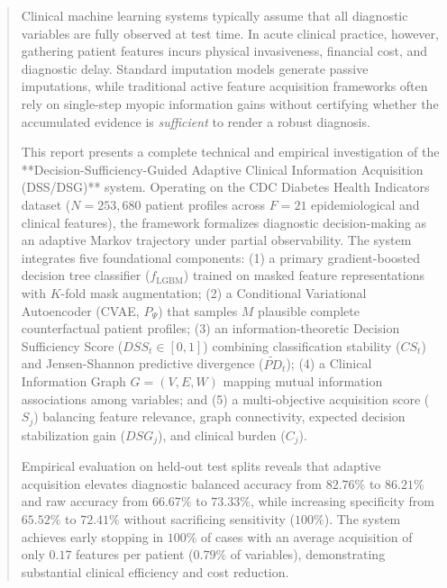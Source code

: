 \documentclass[11pt,a4paper]{report}
\begin{document}
\setcounter{page}{1}

\begin{abstract}
Clinical machine learning systems typically assume that all diagnostic variables are fully observed at test time. In acute clinical practice, however, gathering patient features incurs physical invasiveness, financial cost, and diagnostic delay. Standard imputation models generate passive imputations, while traditional active feature acquisition frameworks often rely on single-step myopic information gains without certifying whether the accumulated evidence is \textit{sufficient} to render a robust diagnosis.

This report presents a complete technical and empirical investigation of the **Decision-Sufficiency-Guided Adaptive Clinical Information Acquisition (DSS/DSG)** system. Operating on the CDC Diabetes Health Indicators dataset ($N=253,680$ patient profiles across $F=21$ epidemiological and clinical features), the framework formalizes diagnostic decision-making as an adaptive Markov trajectory under partial observability. The system integrates five foundational components: (1) a primary gradient-boosted decision tree classifier ($f_{\text{LGBM}}$) trained on masked feature representations with $K$-fold mask augmentation; (2) a Conditional Variational Autoencoder (CVAE, $P_\Psi$) that samples $M$ plausible complete counterfactual patient profiles; (3) an information-theoretic Decision Sufficiency Score ($DSS_t \in [0, 1]$) combining classification stability ($CS_t$) and Jensen-Shannon predictive divergence ($\widetilde{PD}_t$); (4) a Clinical Information Graph $G=(V, E, W)$ mapping mutual information associations among variables; and (5) a multi-objective acquisition score ($S_j$) balancing feature relevance, graph connectivity, expected decision stabilization gain ($DSG_j$), and clinical burden ($C_j$).

Empirical evaluation on held-out test splits reveals that adaptive acquisition elevates diagnostic balanced accuracy from $82.76\%$ to $86.21\%$ and raw accuracy from $66.67\%$ to $73.33\%$, while increasing specificity from $65.52\%$ to $72.41\%$ without sacrificing sensitivity ($100\%$). The system achieves early stopping in $100\%$ of cases with an average acquisition of only $0.17$ features per patient ($0.79\%$ of variables), demonstrating substantial clinical efficiency and cost reduction.
\end{abstract}
\end{document}
